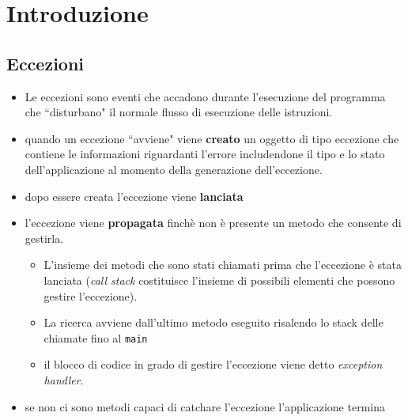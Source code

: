 \documentclass{article}
\author{\textbf{\hmwkAuthorName}}
\date{} %
\begin{document}
\maketitle



\newpage
\tableofcontents
\newpage



\section{Introduzione}


\subsection{Eccezioni}
\begin{itemize}
\item Le eccezioni sono eventi che accadono durante l'esecuzione del programma  che ``disturbano" il normale flusso di esecuzione delle istruzioni. 
\item quando un eccezione ``avviene" viene \textbf{creato} un oggetto di tipo eccezione che contiene le informazioni riguardanti l'errore includendone il tipo e lo stato dell'applicazione al momento della generazione dell'eccezione.
\item dopo essere creata l'eccezione viene \textbf{lanciata}
\item l'eccezione viene \textbf{propagata} finch\`e non \`e presente un metodo che consente di gestirla.
\begin{itemize}
\item L'insieme dei metodi che sono stati chiamati prima che l'eccezione \`e stata lanciata (\emph{call stack} costituisce l'insieme di possibili elementi che possono gestire l'eccezione). 
\item La ricerca avviene dall'ultimo metodo eseguito risalendo lo stack delle chiamate fino al \texttt{main}
\item il blocco di codice in grado di gestire l'eccezione viene detto \emph{exception handler}.
\end{itemize}
\item se non ci sono metodi capaci di catchare l'eccezione l'applicazione termina
\end{itemize}
\end{document}
